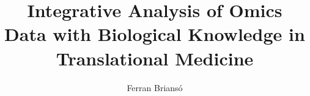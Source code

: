 \documentclass[a4paper, nobind]{templates/ociamthesis}
\title{Integrative Analysis of Omics\\
Data with Biological Knowledge in\\
Translational Medicine}
\author{Ferran Briansó}
\begin{document}
\setlength{\textbaselineskip}{22pt plus2pt}

\setlength{\frontmatterbaselineskip}{17pt plus1pt minus1pt}

\setlength{\abstractseparatelineskip}{13pt plus1pt minus1pt}
\setlength{\abstractseparateparskip}{0pt plus 1pt}

\setlength{\parskip}{2pt plus 1pt}

%
%
\def\crest{{\texttt{[image: templates/logo\\\_UBblanc.png]}}}
\renewcommand{\university}{Universitat de Barcelona}
\renewcommand{\submittedtext}{A thesis submitted for the degree of}
\renewcommand{\thesistitlesize}{\fontsize{22pt}{28pt}\selectfont}
\renewcommand{\gapbeforecrest}{25mm}
\renewcommand{\gapaftercrest}{25mm
}


\setlength{\baselineskip}{\textbaselineskip}



\setcounter{secnumdepth}{2}
\setcounter{tocdepth}{1}


\end{document}
